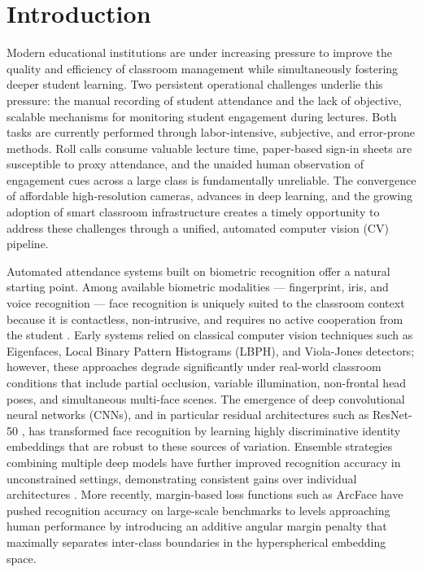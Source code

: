 \documentclass[preprint,12pt]{elsarticle}
\begin{document}
\linenumbers

\section{Introduction}

Modern educational institutions are under increasing pressure to improve the quality and efficiency of classroom management while simultaneously fostering deeper student learning. Two persistent operational challenges underlie this pressure: the manual recording of student attendance and the lack of objective, scalable mechanisms for monitoring student engagement during lectures. Both tasks are currently performed through labor-intensive, subjective, and error-prone methods. Roll calls consume valuable lecture time, paper-based sign-in sheets are susceptible to proxy attendance, and the unaided human observation of engagement cues across a large class is fundamentally unreliable. The convergence of affordable high-resolution cameras, advances in deep learning, and the growing adoption of smart classroom infrastructure creates a timely opportunity to address these challenges through a unified, automated computer vision (CV) pipeline.

Automated attendance systems built on biometric recognition offer a natural starting point. Among available biometric modalities --- fingerprint, iris, and voice recognition --- face recognition is uniquely suited to the classroom context because it is contactless, non-intrusive, and requires no active cooperation from the student \cite{attendance_android}. Early systems relied on classical computer vision techniques such as Eigenfaces, Local Binary Pattern Histograms (LBPH), and Viola-Jones detectors; however, these approaches degrade significantly under real-world classroom conditions that include partial occlusion, variable illumination, non-frontal head poses, and simultaneous multi-face scenes. The emergence of deep convolutional neural networks (CNNs), and in particular residual architectures such as ResNet-50 \cite{resnet}, has transformed face recognition by learning highly discriminative identity embeddings that are robust to these sources of variation. Ensemble strategies combining multiple deep models have further improved recognition accuracy in unconstrained settings, demonstrating consistent gains over individual architectures \cite{ensemble_ieee}. More recently, margin-based loss functions such as ArcFace \cite{arcface} have pushed recognition accuracy on large-scale benchmarks to levels approaching human performance by introducing an additive angular margin penalty that maximally separates inter-class boundaries in the hyperspherical embedding space.
\end{document}

